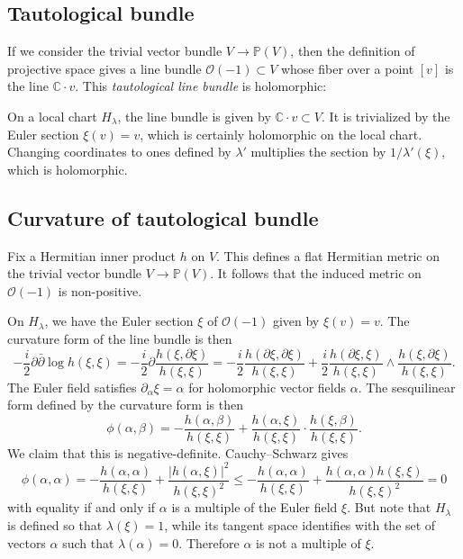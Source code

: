 \documentclass[11pt]{article}
\theoremstyle{definition}
\newcommand{\kk}[1]{\mathbb{#1}}
\newcommand{\cc}[1]{\mathcal{#1}}
\begin{document}
\subsection{Tautological bundle}


If we consider the trivial vector bundle $V \to \kk P(V)$, then the definition of projective space gives a line bundle $\cc O(-1) \subset V$ whose fiber over a point $[v]$ is
the line $\kk C \cdot v$. This \emph{tautological line bundle} is holomorphic:

On a local chart $H_\lambda$, the line bundle is given by $\kk C \cdot v \subset V$. It is trivialized by the Euler section $\xi(v) = v$, which is certainly holomorphic on the local chart. Changing coordinates to ones defined by $\lambda'$ multiplies the section by $1/\lambda'(\xi)$, which is holomorphic.



\subsection{Curvature of tautological bundle}

Fix a Hermitian inner product $h$ on $V$. This defines a flat Hermitian metric on the trivial vector bundle $V \to \kk P(V)$. It follows that the induced metric on $\cc O(-1)$ is non-positive.

On $H_\lambda$, we have the Euler section $\xi$ of $\cc O(-1)$ given by $\xi(v) = v$. The curvature form of the line bundle is then
$$
-\frac i2 \partial \bar\partial \log h(\xi, \xi)
= -\frac i2\partial \frac{h(\xi, \partial \xi)}{h(\xi, \xi)}
= -\frac i2\frac{h(\partial \xi, \partial \xi)}{h(\xi, \xi)}
+ \frac i2\frac{h(\partial \xi, \xi)}{h(\xi, \xi)} \wedge \frac{h(\xi, \partial \xi)}{h(\xi, \xi)}.
$$
The Euler field satisfies $\partial_\alpha \xi = \alpha$ for holomorphic vector fields $\alpha$. The sesquilinear form defined by the curvature form is then
$$
\phi(\alpha, \beta)
= -\frac{h(\alpha, \beta)}{h(\xi, \xi)}
+ \frac{h(\alpha, \xi)}{h(\xi, \xi)} \cdot \frac{h(\xi, \beta)}{h(\xi, \xi)}.
$$
We claim that this is negative-definite. Cauchy--Schwarz gives
$$
\phi(\alpha, \alpha)
= -\frac{h(\alpha, \alpha)}{h(\xi, \xi)}
+ \frac{|h(\alpha, \xi)|^2}{h(\xi, \xi)^2}
\leq -\frac{h(\alpha, \alpha)}{h(\xi, \xi)}
+ \frac{h(\alpha, \alpha) h(\xi, \xi)}{h(\xi, \xi)^2}
= 0
$$
with equality if and only if $\alpha$ is a multiple of the Euler field $\xi$. But note that $H_\lambda$ is defined so that $\lambda(\xi) = 1$, while its tangent space identifies with the set of vectors $\alpha$ such that $\lambda(\alpha) = 0$. Therefore $\alpha$ is not a multiple of $\xi$.
\end{document}

